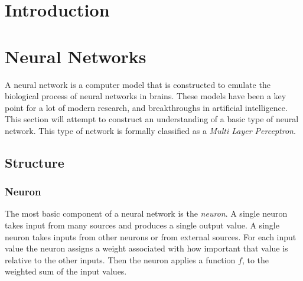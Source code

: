 \documentclass[10pt]{amsart}
\newenvironment{Figure}
{\par\medskip\noindent\minipage{\linewidth}}
{\endminipage\par\medskip}
\begin{document}
\begin{multicols}{2}
  \section{Introduction}%
  \label{sec:introduction}

  \section{Neural Networks}%
  \label{sec:neural_networks}

  A neural network is a computer model that is constructed to emulate the
  biological process of neural networks in brains. These models have been a key
  point for a lot of modern research, and breakthroughs in artificial
  intelligence. This section will attempt to construct an understanding of a
  basic type of neural network. This type of network is formally classified as a
  \textit{Multi Layer Perceptron}.

  \subsection{Structure}%
  \label{sub:structure}

  \subsubsection{Neuron}%
  \label{ssub:neuron}

  The most basic component of a neural network is the \textit{neuron}. A single
  neuron takes input from many sources and produces a single output value. A
  single neuron takes inputs from other neurons or from external sources. For
  each input value the neuron assigns a weight associated with how important
  that value is relative to the other inputs. Then the neuron applies a
  function $f$, to the weighted sum of the input values.

  \begin{Figure}
    \begin{center}
      
    \end{center}
    \label{fig:nn_single}
  \end{Figure}


\end{multicols}
\end{document}
